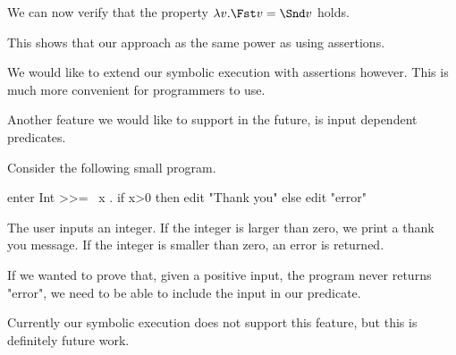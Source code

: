We can now verify that the property $\lambda v . \Fst v = \Snd v$ holds.

This shows that our approach as the same power as using assertions.

We would like to extend our symbolic execution with assertions however.
This is much more convenient for programmers to use.

Another feature we would like to support in the future, is input dependent predicates.

\begin{example}
  Consider the following small program.

  \begin{TASK}
    enter Int >>= \ x . if x>0 then edit "Thank you" else edit "error"
  \end{TASK}

  The user inputs an integer.
  If the integer is larger than zero, we print a thank you message.
  If the integer is smaller than zero, an error is returned.

  If we wanted to prove that, given a positive input, the program never returns "error", we need to be able to include the input in our predicate.
\end{example}

Currently our symbolic execution does not support this feature, but this is definitely future work.
